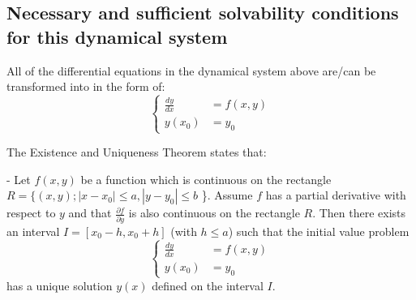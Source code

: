 \documentclass[a4paper]{article}
\numberwithin{equation}{section}
\begin{document}
\subsection{Necessary and sufficient solvability conditions for this dynamical system}
All of the differential equations in the dynamical system above are/can be transformed into in the form of:
\begin{equation*}
  \begin{cases}
    \frac{dy}{dx} & = f(x,y) \\
    y(x_0)        & = y_0
  \end{cases}
\end{equation*}

The Existence and Uniqueness Theorem states that:

- Let \(f(x,y)\) be a function which is continuous on the rectangle  \(R = \{(x, y); |x - x_0| \leq a, |y - y_0| \leq b\) \}.
Assume \(f\) has a partial derivative with respect to \(y\) and that \(\frac{\partial f}{\partial y}\) is also continuous on the rectangle \(R\).
Then there exists an interval \(I=[x_0-h, x_0+h]\) (with \(h \leq a\)) such that the initial value problem
\begin{equation*}
  \begin{cases}
    \frac{dy}{dx} & = f(x,y) \\
    y(x_0)        & = y_0
  \end{cases}
\end{equation*}
has a unique solution \(y(x)\) defined on the interval \(I\).
\end{document}
